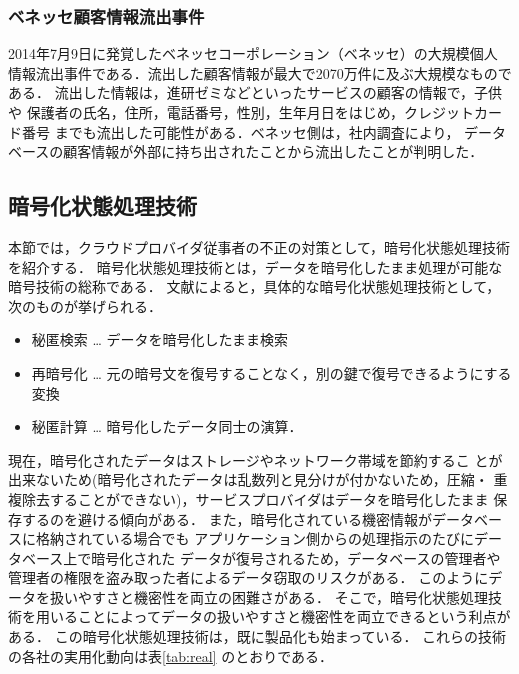 \subsubsection{ベネッセ顧客情報流出事件}
2014年7月9日に発覚したベネッセコーポレーション（ベネッセ）の大規模個人
情報流出事件である．流出した顧客情報が最大で2070万件に及ぶ大規模なものである．
流出した情報は，進研ゼミなどといったサービスの顧客の情報で，子供や
保護者の氏名，住所，電話番号，性別，生年月日をはじめ，クレジットカード番号
までも流出した可能性がある．ベネッセ側は，社内調査により，
データベースの顧客情報が外部に持ち出されたことから流出したことが判明した．



\subsection{暗号化状態処理技術}
本節では，クラウドプロバイダ従事者の不正の対策として，暗号化状態処理技術を紹介する．
暗号化状態処理技術とは，データを暗号化したまま処理が可能な暗号技術の総称である．
文献\cite{sym}によると，具体的な暗号化状態処理技術として，次のものが挙げられる．

\begin{itemize}
\item 秘匿検索 … データを暗号化したまま検索
\item 再暗号化 … 元の暗号文を復号することなく，別の鍵で復号できるようにする変換
\item 秘匿計算 … 暗号化したデータ同士の演算．
\end{itemize}

現在，暗号化されたデータはストレージやネットワーク帯域を節約するこ
とが出来ないため(暗号化されたデータは乱数列と見分けが付かないため，圧縮・
重複除去することができない)，サービスプロバイダはデータを暗号化したまま
保存するのを避ける傾向がある．
また，暗号化されている機密情報がデータベースに格納されている場合でも
アプリケーション側からの処理指示のたびにデータベース上で暗号化された
データが復号されるため，データベースの管理者や管理者の権限を盗み取った者によるデータ窃取のリスクがある．
このようにデータを扱いやすさと機密性を両立の困難さがある．
そこで，暗号化状態処理技術を用いることによってデータの扱いやすさと機密性を両立できるという利点がある．
この暗号化状態処理技術は，既に製品化も始まっている．
これらの技術の各社の実用化動向は表\ref{tab:real} のとおりである．


